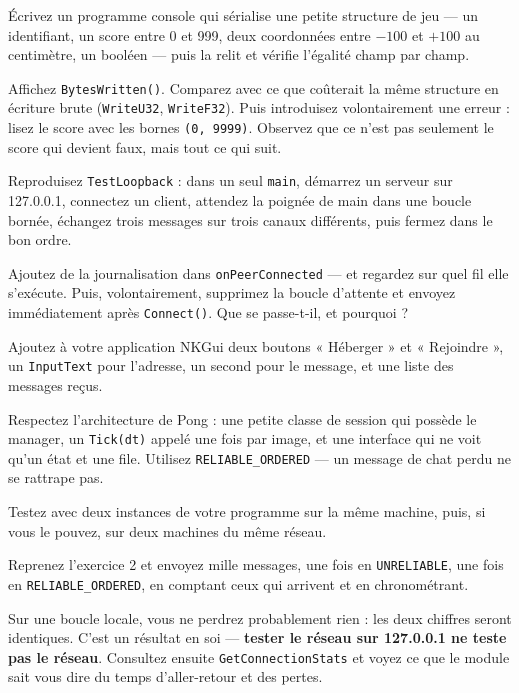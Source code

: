 \begin{nkpratique}
Écrivez un programme console qui sérialise une petite structure de jeu — un
identifiant, un score entre 0 et 999, deux coordonnées entre $-100$ et $+100$ au
centimètre, un booléen — puis la relit et vérifie l'égalité champ par champ.

Affichez \texttt{BytesWritten()}. Comparez avec ce que coûterait la même
structure en écriture brute (\texttt{WriteU32}, \texttt{WriteF32}). Puis
introduisez volontairement une erreur : lisez le score avec les bornes
\texttt{(0, 9999)}. Observez que ce n'est pas seulement le score qui devient
faux, mais tout ce qui suit.
\end{nkpratique}

\begin{nkpratique}
Reproduisez \texttt{TestLoopback} : dans un seul \texttt{main}, démarrez un
serveur sur 127.0.0.1, connectez un client, attendez la poignée de main dans une
boucle bornée, échangez trois messages sur trois canaux différents, puis fermez
dans le bon ordre.

Ajoutez de la journalisation dans \texttt{onPeerConnected} — et regardez sur quel
fil elle s'exécute. Puis, volontairement, supprimez la boucle d'attente et
envoyez immédiatement après \texttt{Connect()}. Que se passe-t-il, et pourquoi ?
\end{nkpratique}

\begin{nkpratique}
Ajoutez à votre application NKGui deux boutons « Héberger » et « Rejoindre », un
\texttt{InputText} pour l'adresse, un second pour le message, et une liste des
messages reçus.

Respectez l'architecture de Pong : une petite classe de session qui possède le
manager, un \texttt{Tick(dt)} appelé une fois par image, et une interface qui ne
voit qu'un état et une file. Utilisez \texttt{RELIABLE\_ORDERED} — un message de
chat perdu ne se rattrape pas.

Testez avec deux instances de votre programme sur la même machine, puis, si vous
le pouvez, sur deux machines du même réseau.
\end{nkpratique}

\begin{nkdemo}
Reprenez l'exercice 2 et envoyez mille messages, une fois en
\texttt{UNRELIABLE}, une fois en \texttt{RELIABLE\_ORDERED}, en comptant ceux qui
arrivent et en chronométrant.

Sur une boucle locale, vous ne perdrez probablement rien : les deux chiffres
seront identiques. C'est un résultat en soi — \textbf{tester le réseau sur
127.0.0.1 ne teste pas le réseau}. Consultez ensuite
\texttt{GetConnectionStats} et voyez ce que le module sait vous dire du temps
d'aller-retour et des pertes.
\end{nkdemo}

